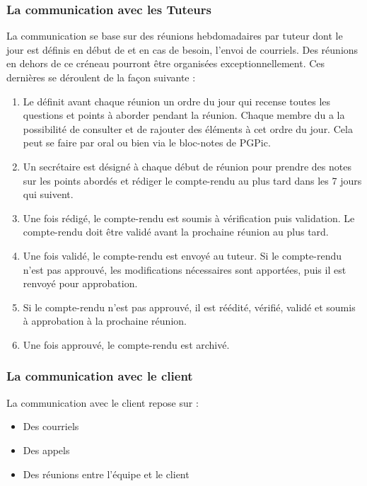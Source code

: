 \subsubsection*{La communication avec les Tuteurs}
La communication se base sur des réunions hebdomadaires par tuteur dont le jour est définis en début de \PICCourt et en cas de besoin, l’envoi de courriels. Des réunions en dehors de ce créneau pourront être organisées exceptionnellement. Ces dernières se déroulent de la façon suivante :
\begin{enumerate}
\item Le \CP{} définit avant chaque réunion un ordre du jour qui recense toutes les questions et points à aborder pendant la réunion. Chaque membre du \PICCourt{} a la possibilité de consulter et de rajouter des éléments à cet ordre du jour. Cela peut se faire par oral ou bien via le bloc-notes de PGPic. 
\item Un secrétaire est désigné à chaque début de réunion pour prendre des notes sur les points abordés et rédiger le compte-rendu au plus tard dans les 7 jours qui suivent.
\item Une fois rédigé, le compte-rendu est soumis à vérification puis validation. Le compte-rendu doit être validé avant la prochaine réunion au plus tard.
\item Une fois validé, le compte-rendu est envoyé au tuteur. Si le compte-rendu n’est pas approuvé, les modifications nécessaires sont apportées, puis il est renvoyé pour approbation.
\item Si le compte-rendu n’est pas approuvé, il est réédité, vérifié, validé et soumis à approbation à la prochaine réunion.
\item Une fois approuvé, le compte-rendu est archivé. 
\end{enumerate}

\subsubsection*{La communication avec le client}

La communication avec le client repose sur : 
\begin{itemize}
\item Des courriels
\item Des appels
\item Des réunions entre l'équipe et le client \\
\end{itemize}

